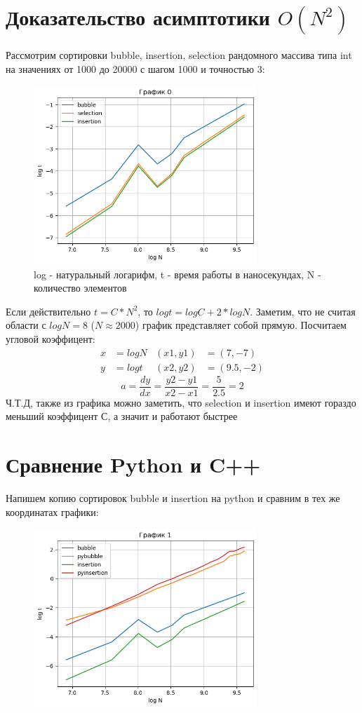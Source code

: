 \documentclass[12pt,onecolumn]{article}
\begin{document}
\section{Доказательство асимптотики $O(N^2)$}
Рассмотрим сортировки bubble, insertion, selection рандомного массива типа int на значениях от 1000 до 20000 с шагом 1000 и точностью 3:
\begin{figure}[H]
    \centering
    \includegraphics[width=0.75\textwidth]{Assets/graph0.png}
    \caption{log - натуральный логарифм, t - время работы в наносекундах, N - количество элементов}
\end{figure}

Если действительно $t = C * N ^ 2$, то $log t = log C + 2 * log N$. Заметим, что не считая области с $log N = 8$ ($N \approx 2000$) график представляет собой прямую. Посчитаем угловой коэффицент:
\begin{align*}
x &= log N & (x1, y1) &= (7, -7) \\
y &= log t & (x2, y2) &= (9.5, -2)
\end{align*}
\[a = \frac{dy}{dx} = \frac{y2 - y1}{x2 - x1} = \frac{5}{2.5} = 2 \]
Ч.Т.Д, также из графика можно заметить, что selection и insertion имеют гораздо меньший коэффицент С, а значит и работают быстрее
\section{Сравнение Python и C++}
Напишем копию сортировок bubble и insertion на python и сравним в тех же координатах графики:
\begin{figure}[H]
    \centering
    \includegraphics[width=0.75\textwidth]{Assets/graph1.png}
\end{figure}
\end{document}
